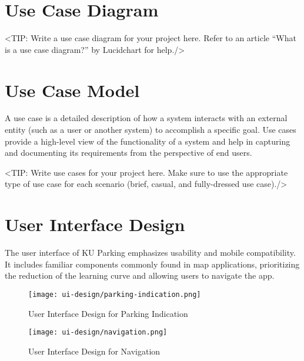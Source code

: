 



\section{Use Case Diagram}
\label{section:use-case-diagram}
<TIP: Write a use case diagram for your project here. Refer to an
article “What is a use case diagram?” by Lucidchart for help./>

\section{Use Case Model}
\label{section:use-case-model}
A use case is a detailed description of how a system
interacts with an external entity (such as a user or another system) to
accomplish a specific goal. Use cases provide a high-level view of the
functionality of a system and help in capturing and documenting its
requirements from the perspective of end users.

<TIP: Write use cases for your project here. Make sure to use the
appropriate type of use case for each scenario (brief, casual, and fully-dressed
use case)./>

\section{User Interface Design}
\label{section:user-interface-design}
The user interface of KU Parking emphasizes usability and mobile compatibility. It includes familiar components commonly found in map applications, prioritizing the reduction of the learning curve and allowing users to navigate the app.

\begin{figure}[h]
    \centering
    \texttt{[image: ui-design/parking-indication.png]}
    \caption{User Interface Design for Parking Indication}
\end{figure}

\begin{figure}[h]
    \centering
    \texttt{[image: ui-design/navigation.png]}
    \caption{User Interface Design for Navigation}
\end{figure}